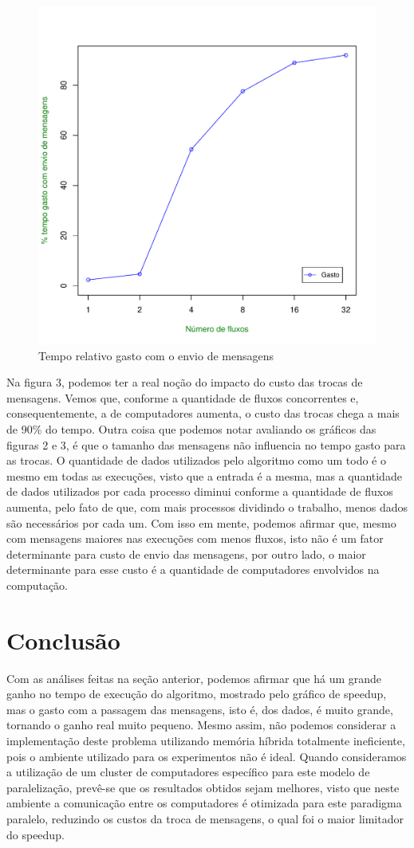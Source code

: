 \documentclass[12pt]{article}
\begin{document}
\begin{figure}[ht!]
\centering
\includegraphics[width=.5\textwidth]{msgsp.pdf}
\caption{Tempo relativo gasto com o envio de mensagens}
\label{fig:desvios}
\end{figure}

Na figura 3, podemos ter a real noção do impacto do custo das trocas de mensagens. Vemos que, conforme a quantidade de fluxos concorrentes e, consequentemente, a de computadores aumenta, o custo das trocas chega a mais de 90\% do tempo. Outra coisa que podemos notar avaliando os gráficos das figuras 2 e 3, é que o tamanho das mensagens não influencia no tempo gasto para as trocas. O quantidade de dados utilizados pelo algoritmo como um todo é o mesmo em todas as execuções, visto que a entrada é a mesma, mas a quantidade de dados utilizados por cada processo diminui conforme a quantidade de fluxos aumenta, pelo fato de que, com mais processos dividindo o trabalho, menos dados são necessários por cada um. Com isso em mente, podemos afirmar que, mesmo com mensagens maiores nas execuções com menos fluxos, isto não é um fator determinante para custo de envio das mensagens, por outro lado, o maior determinante para esse custo é a quantidade de computadores envolvidos na computação.

\section{Conclusão}

Com as análises feitas na seção anterior, podemos afirmar que há um grande ganho no tempo de execução do algoritmo, mostrado pelo gráfico de speedup, mas o gasto com a passagem das mensagens, isto é, dos dados, é muito grande, tornando o ganho real muito pequeno. Mesmo assim, não podemos considerar a implementação deste problema utilizando memória híbrida totalmente ineficiente, pois o ambiente utilizado para os experimentos não é ideal. Quando consideramos a utilização de um cluster de computadores específico para este modelo de paralelização, prevê-se que os resultados obtidos sejam melhores, visto que neste ambiente a comunicação entre os computadores é otimizada para este paradigma paralelo, reduzindo os custos da troca de mensagens, o qual foi o maior limitador do speedup.
\end{document}
